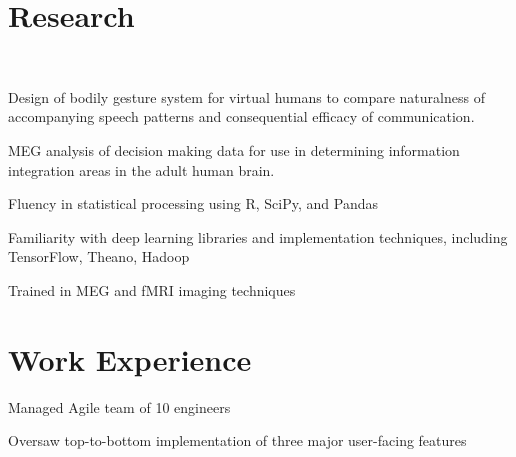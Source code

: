 \documentclass[]{csaund_resume-openfont}
\begin{document}
\begin{minipage}[t]{0.66\textwidth}



\section{Research}
 \\
\vspace{\topsep} %
\begin{tightemize}
\item Design of bodily gesture system for virtual humans to compare naturalness of accompanying speech patterns and consequential efficacy of communication.
\item MEG analysis of decision making data for use in determining information integration areas in the adult human brain.
\end{tightemize}
\sectionsep
{}
\begin{tightemize}
\item Fluency in statistical processing using R, SciPy, and Pandas
\item Familiarity with deep learning libraries and implementation techniques, including TensorFlow, Theano, Hadoop
\item Trained in MEG and fMRI imaging techniques
\end{tightemize}
\sectionsep


\section{Work Experience}

\begin{tightemize}
\item Managed Agile team of 10 engineers 
\item Oversaw top-to-bottom implementation of three major user-facing features
\end{tightemize}


\end{minipage}
\end{document}
